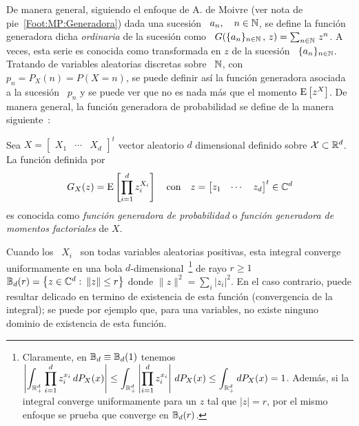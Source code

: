 De  manera  general,  siguiendo  el  enfoque  de A.   de  Moivre  (ver  nota  de
pie~\ref{Foot:MP:Generadora}) dada una sucesi\'on \ $a_n, \quad n \in \mathbb{N}$, se
define la  funci\'on generadora  dicha {\em ordinaria}  de la sucesi\'on  como \
$G(\{ a_n  \}_{n \in \mathbb{N}} \,  , \, z) =  \sum_{n \in \mathbb{N}} \,  z^n$. A veces,
esta serie es conocida como transformada en $z$ de la sucesi\'on \ $\{ a_n \}_{n
  \in \mathbb{N}}$. Tratando de variables aleatorias discretas sobre \ $\mathbb{N}$, con \
$p_n  = P_X(n)  = P(X  = n)$,  se puede  definir as\'i  la  funci\'on generadora
asociada a  la sucesi\'on \  $p_n$ y se  puede ver que no  es nada m\'as  que el
momento $\operatorname{E}\left[ z^X \right]$.  De manera general, la funci\'on generadora de
probabilidad  se define  de  la manera  siguiente~\cite{Fel68, JohKot97,  Muk00,
  AthLah06}:
%
\begin{definicion}\label{Def:MP:GeneradoraProbabilidadFactorial}
  Sea $X = \begin{bmatrix} X_1  & \cdots & X_d \end{bmatrix}^t$ vector aleatorio
  $d$ dimensional  definido sobre $\mathcal{X}  \subset \mathbb{R}^d$.  La  funci\'on definida
  por
  \[
  G_X(z) =  \operatorname{E}\left[ \prod_{i=1}^d  z_i^{X_i} \right]\quad \mbox{con}  \quad z
  = \begin{bmatrix} z_1 & \cdots & z_d \end{bmatrix}^t \in \mathbb{C}^d
  \]
  es conocida como  {\em funci\'on generadora de probabilidad}  o {\em funci\'on
    generadora de momentos factoriales} de $X$.
\end{definicion}
%
\noindent Cuando  los \ $X_i$ \  son todas variables  aleatorias positivas, esta
integral         converge        uniformamente        en         una        bola
$d$-dimensional~\footnote{Claramente,  en  $\mathbb{B}_d  \equiv \mathbb{B}_d(1)$  tenemos
  $\displaystyle  \left|  \int_{\mathbb{R}_+^d}  \prod_{i=1}^d z_i^{x_i}  \,  dP_X(x)
  \right| \le \int_{\mathbb{R}_+^d} \left| \prod_{i=1}^d z_i^{x_i} \right| \, dP_X(x)
  \le  \int_{\mathbb{R}_+^d}  dP_X(x)  =   1$.  Adem\'as,  si  la  integral  converge
  uniformamente para un  $z$ tal que $|z|  = r$, por el mismo  enfoque se prueba
  que converge en  $\mathbb{B}_d(r)$.} de rayo $r \ge 1$ $\mathbb{B}_d(r)  = \left\{ z \in
  \mathbb{C}^d: \: \| z \| \le r \right\}$  donde $\| z \|^2 = \sum_i |z_i|^2$. En el
caso  contrario,  puede resultar  delicado  en  termino  de existencia  de  esta
funci\'on  (convergencia de la  integral); se  puede por  ejemplo que,  para una
variables, no existe ninguno dominio de existencia de esta funci\'on.

